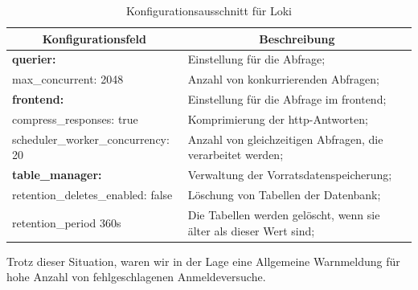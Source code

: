 \begin{table}[H]
  \begin{tabularx}{\textwidth}{|b{7cm}|X|}
  \hline
  \multicolumn{1}{|c|}{\textbf{Konfigurationsfeld}} & \multicolumn{1}{|c|}{\textbf{Beschreibung}} \\ \hline
  \textbf{querier:} & Einstellung für die Abfrage; \\ 
  \hphantom{10}max\_concurrent: 2048 & Anzahl von konkurrierenden Abfragen;\\ \hline
  \textbf{frontend:} & Einstellung für die Abfrage im \gls{frontend};\\
  \hphantom{10}compress\_responses: true & Komprimierung der \gls{http}-Antworten;\\
  \hphantom{10}scheduler\_worker\_concurrency: 20 & Anzahl von gleichzeitigen Abfragen, die verarbeitet werden; \\  \hline
  \textbf{table\_manager:} & Verwaltung der Vorratsdatenspeicherung;\\ 
  \hphantom{10}retention\_deletes\_enabled: false & Löschung von Tabellen der Datenbank;\\ 
  \hphantom{10}retention\_period 360s & Die Tabellen werden gelöscht, wenn sie älter als dieser Wert sind;\\ \hline
  \bottomrule
  \end{tabularx}
  \caption[Konfigurationsausschnitt für Loki]
  {Konfigurationsausschnitt für Loki}
  \label{tab:KonfigLoki}
\end{table}

Trotz dieser Situation, waren wir in der Lage eine Allgemeine Warnmeldung für hohe Anzahl von fehlgeschlagenen Anmeldeversuche.






